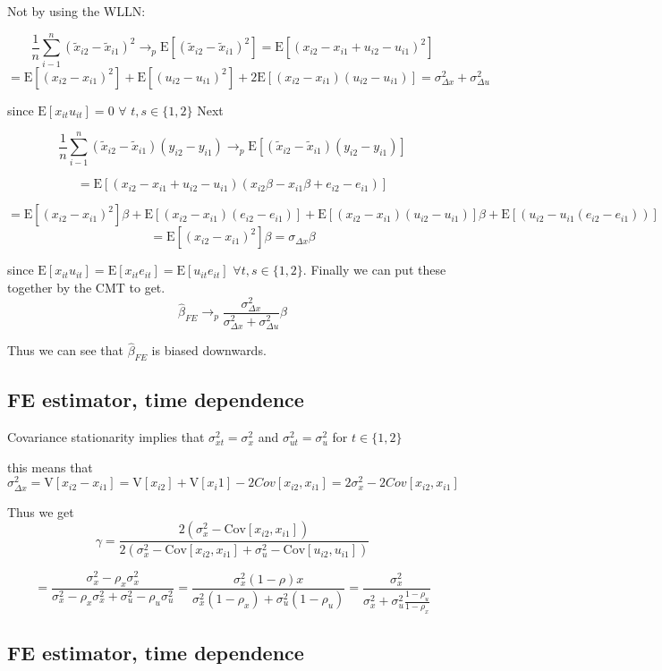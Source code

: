 \documentclass[11pt]{article}
\newcommand{\Cov}{\mathrm{Cov}}
\newcommand{\plim}{\rightarrow_{p}}
\newcommand{\E}{\mathrm{E}}
\newcommand{\V}{\mathrm{V}}
\begin{document}
 Not by using the WLLN:
 
 $$ \frac{1}{n} \sum_{i-1}^{n}(\tilde{x}_{i2} - \tilde{x}_{i1} )^2 \plim \E[(\tilde{x}_{i2} - \tilde{x}_{i1} )^2]
  = \E[(x_{i2} - x_{i1} + u_{i2} - u_{i1})^2]$$
  $$ =  \E[(x_{i2} - x_{i1})^2] +\E[(u_{i2} - u_{i1})^2] +2\E[(x_{i2} - x_{i1})(u_{i2}-u_{i1})] = \sigma_{\Delta x}^2 + \sigma_{\Delta u}^2
  $$
  
  since $\E[x_{it}u_{it}] = 0$ $\forall$ $t,s \in \{1,2\}$ Next 
  
  $$\frac{1}{n} \sum_{i-1}^{n}(\tilde{x}_{i2} - \tilde{x}_{i1} )(y_{i2} - y_{i1}) \plim \E[(\tilde{x}_{i2} - \tilde{x}_{i1} )(y_{i2} - y_{i1})]$$
  
  $$ = \E[(x_{i2} - x_{i1} + u_{i2} -u_{i1})(x_{i2}\beta - x_{i1}\beta + e_{i2} - e_{i1})]$$
  
  $$ = \E[(x_{i2}-x_{i1})^2]\beta + \E[(x_{i2}-x_{i1})(e_{i2}-e_{i1})] + \E[(x_{i2}-x_{i1})( u_{i2} -u_{i1})]\beta + \E[(u_{i2} - u_{i1}(e_{i2} - e_{i1}))]
$$
$$ = \E[(x_{i2} - x_{i1})^2]\beta = \sigma_{\Delta x}\beta $$

since $\E[x_{it}u_{it}] = \E[x_{it}e_{it}] =  \E[u_{it}e_{it}] $ $\forall t,s \in \{1,2\}$. Finally we can put these together by the CMT to get. 
$$ \hat{\beta}_{FE} \plim \frac{\sigma_{\Delta x}^2}{\sigma_{\Delta x}^2 + \sigma_{\Delta u}^2} \beta
$$

Thus we can see that $\hat{\beta}_{FE}$ is biased downwards.

\subsection{FE estimator, time dependence}
Covariance stationarity implies that $\sigma_{xt}^2 = \sigma_x^2$ and $\sigma_{ut}^2 = \sigma_u^2$ for $t \in \{1,2\}$

this means that 
$$\sigma_{\Delta x}^2 =  \V[x_{i2} - x_{i1}] = \V[x_{i2}] + \V[x_i1] - 2Cov[x_{i2},x_{i1}] = 2\sigma_x^2 - 2Cov[x_{i2}, x_{i1}] $$

Thus we get 
$$\gamma = \frac{2(\sigma_x^2 - \Cov[x_{i2}, x_{i1}])}{2(\sigma_x^2 - \Cov[x_{i2}, x_{i1}] + \sigma_u^2 - \Cov[u_{i2}, u_{i1}])}$$

$$
= \frac{\sigma_x^2 - \rho_x \sigma_x^2 }{\sigma_x^2 - \rho_x \sigma_x^2 + \sigma_u^2 - \rho_u \sigma_u^2} = \frac{\sigma_x^2(1-\rho)x}{\sigma_x^2(1-\rho_x) + \sigma_u^2(1-\rho_u)} = \frac{\sigma_x^2}{\sigma_x^2 + \sigma_u^2 \frac{1-\rho_u}{1-\rho_x}}
$$

\subsection{FE estimator, time dependence}
\end{document}
